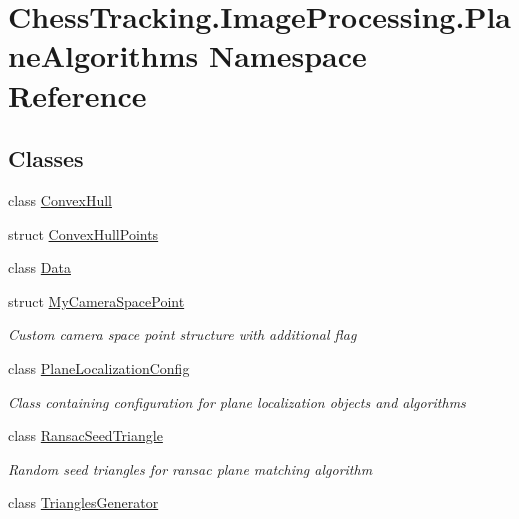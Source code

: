 \hypertarget{namespace_chess_tracking_1_1_image_processing_1_1_plane_algorithms}{}\section{Chess\+Tracking.\+Image\+Processing.\+Plane\+Algorithms Namespace Reference}
\label{namespace_chess_tracking_1_1_image_processing_1_1_plane_algorithms}
\subsection*{Classes}
\begin{DoxyCompactItemize}
\item 
class \mbox{\hyperlink{class_chess_tracking_1_1_image_processing_1_1_plane_algorithms_1_1_convex_hull}{Convex\+Hull}}
\item 
struct \mbox{\hyperlink{struct_chess_tracking_1_1_image_processing_1_1_plane_algorithms_1_1_convex_hull_points}{Convex\+Hull\+Points}}
\item 
class \mbox{\hyperlink{class_chess_tracking_1_1_image_processing_1_1_plane_algorithms_1_1_data}{Data}}
\item 
struct \mbox{\hyperlink{struct_chess_tracking_1_1_image_processing_1_1_plane_algorithms_1_1_my_camera_space_point}{My\+Camera\+Space\+Point}}
\begin{DoxyCompactList}\small\item\em Custom camera space point structure with additional flag \end{DoxyCompactList}\item 
class \mbox{\hyperlink{class_chess_tracking_1_1_image_processing_1_1_plane_algorithms_1_1_plane_localization_config}{Plane\+Localization\+Config}}
\begin{DoxyCompactList}\small\item\em Class containing configuration for plane localization objects and algorithms \end{DoxyCompactList}\item 
class \mbox{\hyperlink{class_chess_tracking_1_1_image_processing_1_1_plane_algorithms_1_1_ransac_seed_triangle}{Ransac\+Seed\+Triangle}}
\begin{DoxyCompactList}\small\item\em Random seed triangles for ransac plane matching algorithm \end{DoxyCompactList}\item 
class \mbox{\hyperlink{class_chess_tracking_1_1_image_processing_1_1_plane_algorithms_1_1_triangles_generator}{Triangles\+Generator}}
\end{DoxyCompactItemize}
